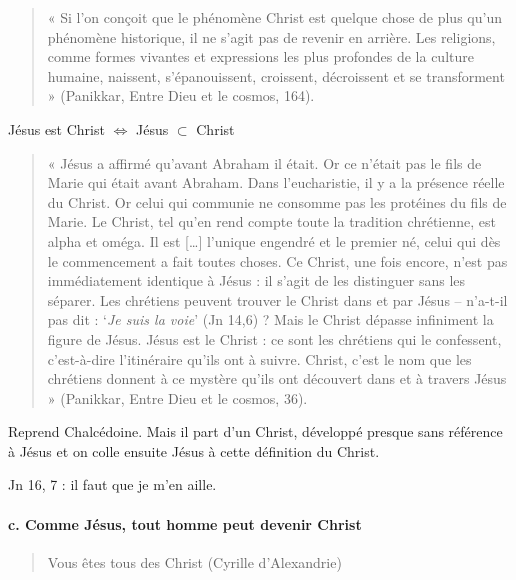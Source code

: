  
\begin{quote}
    
« Si l’on conçoit que le phénomène Christ est quelque chose de plus qu’un phénomène historique, il 
ne s’agit pas de revenir en arrière. Les religions, comme formes vivantes et expressions les plus 
profondes de la culture humaine, naissent, s’épanouissent, croissent, décroissent et se 
transforment » (Panikkar, Entre Dieu et le cosmos, 164).

\end{quote}
Jésus est Christ $ \Leftrightarrow$ Jésus $\subset$ Christ
\begin{quote}
« Jésus a affirmé qu’avant Abraham il était. Or ce n’était pas le fils de Marie qui était avant 
Abraham. Dans l’eucharistie, il y a la présence réelle du Christ. Or celui qui communie ne consomme 
pas les protéines du fils de Marie. Le Christ, tel qu’en rend compte toute la tradition chrétienne, 
est alpha et oméga. Il est […] l’unique engendré et le premier né, celui qui dès le commencement a 
fait toutes choses. Ce Christ, une fois encore, n’est pas immédiatement identique à Jésus : il 
s’agit de les distinguer sans les séparer. Les chrétiens peuvent trouver le Christ dans et par 
Jésus – n’a-t-il pas dit : ‘\textit{Je suis la voie}’ (Jn 14,6) ? Mais le Christ dépasse infiniment la 
figure de Jésus. Jésus est le Christ : ce sont les chrétiens qui le
confessent, c’est-à-dire l’itinéraire qu’ils ont à suivre. Christ, c’est le nom que les chrétiens 
donnent à ce mystère qu’ils ont découvert dans et à travers Jésus » (Panikkar, Entre Dieu et le 
cosmos, 36).
\end{quote}

Reprend Chalcédoine. Mais il part d'un Christ, développé presque sans référence à Jésus et on colle ensuite Jésus à cette définition du Christ.

Jn 16, 7 : il faut que je m'en aille.  

\paragraph{c. Comme Jésus, tout homme peut devenir Christ} 

\begin{quote}
    Vous êtes tous des Christ (Cyrille d'Alexandrie)
\end{quote}

